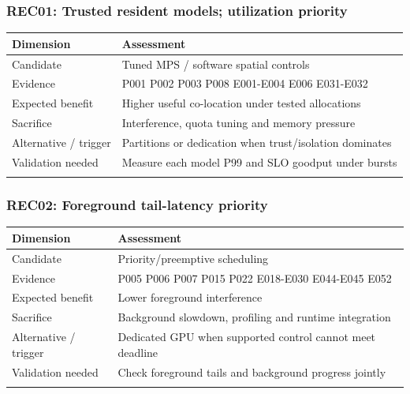 \subsubsection*{REC01: Trusted resident models; utilization priority}
\begin{longtable}{>{\raggedright\arraybackslash}p{}>{\raggedright\arraybackslash}p{}}
\toprule
\textbf{Dimension} & \textbf{Assessment}\\\midrule\endhead
Candidate & Tuned MPS / software spatial controls\\\addlinespace
Evidence & P001 P002 P003 P008 E001-E004 E006 E031-E032\\\addlinespace
Expected benefit & Higher useful co-location under tested allocations\\\addlinespace
Sacrifice & Interference, quota tuning and memory pressure\\\addlinespace
Alternative / trigger & Partitions or dedication when trust/isolation dominates\\\addlinespace
Validation needed & Measure each model P99 and SLO goodput under bursts\\\addlinespace
\bottomrule\end{longtable}
\subsubsection*{REC02: Foreground tail-latency priority}
\begin{longtable}{>{\raggedright\arraybackslash}p{}>{\raggedright\arraybackslash}p{}}
\toprule
\textbf{Dimension} & \textbf{Assessment}\\\midrule\endhead
Candidate & Priority/preemptive scheduling\\\addlinespace
Evidence & P005 P006 P007 P015 P022 E018-E030 E044-E045 E052\\\addlinespace
Expected benefit & Lower foreground interference\\\addlinespace
Sacrifice & Background slowdown, profiling and runtime integration\\\addlinespace
Alternative / trigger & Dedicated GPU when supported control cannot meet deadline\\\addlinespace
Validation needed & Check foreground tails and background progress jointly\\\addlinespace
\bottomrule\end{longtable}

